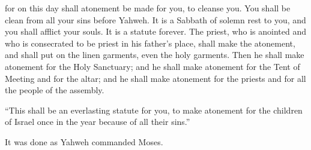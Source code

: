 {for on this day shall atonement be made for you, to cleanse you. You shall be clean from all your sins before Yahweh.
It is a Sabbath of solemn rest to you, and you shall afflict your souls. It is a statute forever.
The priest, who is anointed and who is consecrated to be priest in his father’s place, shall make the atonement, and shall put on the linen garments, even the holy garments.
Then he shall make atonement for the Holy Sanctuary; and he shall make atonement for the Tent of Meeting and for the altar; and he shall make atonement for the priests and for all the people of the assembly.
\par }{\PP {}“This shall be an everlasting statute for you, to make atonement for the children of Israel once in the year because of all their sins.”
\par }{\PP It was done as Yahweh commanded Moses.

}
